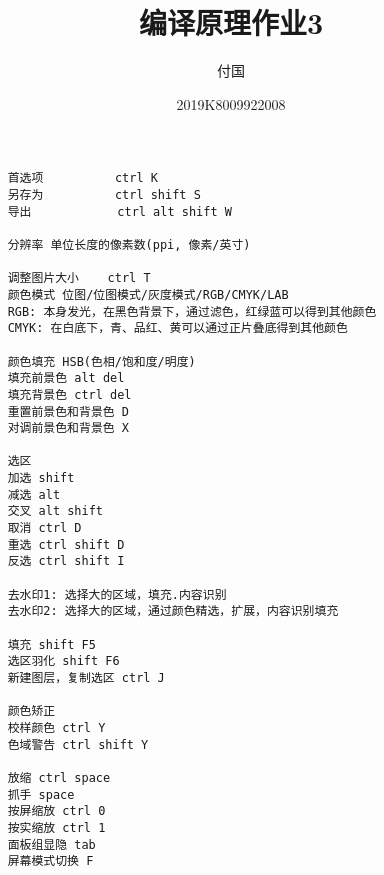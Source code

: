 \documentclass[12pt]{ctexart}
\title{编译原理作业3}
\author{付国}
\date{2019K8009922008}
\begin{document}
\begin{Verbatim}
    首选项          ctrl K
    另存为          ctrl shift S
    导出            ctrl alt shift W

    分辨率 单位长度的像素数(ppi, 像素/英寸)

    调整图片大小    ctrl T
    颜色模式 位图/位图模式/灰度模式/RGB/CMYK/LAB
    RGB: 本身发光，在黑色背景下，通过滤色，红绿蓝可以得到其他颜色
    CMYK: 在白底下，青、品红、黄可以通过正片叠底得到其他颜色

    颜色填充 HSB(色相/饱和度/明度)
    填充前景色 alt del
    填充背景色 ctrl del
    重置前景色和背景色 D
    对调前景色和背景色 X
    
    选区
    加选 shift
    减选 alt
    交叉 alt shift
    取消 ctrl D
    重选 ctrl shift D
    反选 ctrl shift I

    去水印1: 选择大的区域，填充.内容识别
    去水印2: 选择大的区域，通过颜色精选，扩展，内容识别填充

    填充 shift F5
    选区羽化 shift F6
    新建图层，复制选区 ctrl J

    颜色矫正
    校样颜色 ctrl Y
    色域警告 ctrl shift Y

    放缩 ctrl space
    抓手 space
    按屏缩放 ctrl 0
    按实缩放 ctrl 1
    面板组显隐 tab
    屏幕模式切换 F
\end{Verbatim}
\end{document}
